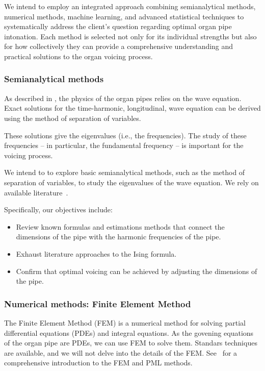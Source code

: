 \documentclass{psu-plan}
\begin{document}
We intend to employ an integrated approach combining semianalytical methods, numerical methods, machine learning, 
and advanced statistical techniques to systematically address the client's question regarding optimal organ 
pipe intonation.
Each method is selected not only for its individual strengths but also for how collectively they can provide 
a comprehensive understanding and practical solutions to the organ voicing process.

\subsubsection{Semianalytical methods}

As described in \autocite{2004RosFle-1}, the physics of the organ pipes relies
on the wave equation.
Exact solutions for the time-harmonic, longitudinal, wave equation can be
derived using the method of separation of variables.

These solutions give the eigenvalues (i.e., the frequencies). 
The study of these frequencies -- in particular, the fundamental
frequency -- is important for the voicing process.

We intend to to explore basic semianalytical methods, such as the method of
separation of variables, to study the eigenvalues of the wave equation.
We rely on available literature~\autocite{2004RosFle-1, 2012RosFle-1}.

Specifically, our objectives include:
\begin{itemize}
    \item Review known formulas and estimations methods that connect the
        dimensions of the pipe with the harmonic frequencies of the pipe.
    \item Exhaust literature approaches to the Ising formula.
    \item Confirm that optimal voicing can be achieved by adjusting the
        dimensions of the pipe.
\end{itemize}

\subsubsection{Numerical methods: Finite Element Method}

The Finite Element Method (FEM) is a numerical method for solving partial
differential equations (PDEs) and integral equations.
As the govening equations of the organ pipe are PDEs, we can use FEM to solve
them.
Standars techniques are available, and we will not delve into the details of the
FEM.
See~\autocite{2021ErnGue-1, 2021ErnGue-2, 2019VazKeeDem-1} for a
comprehensive introduction to the FEM and PML methods.
\end{document}
